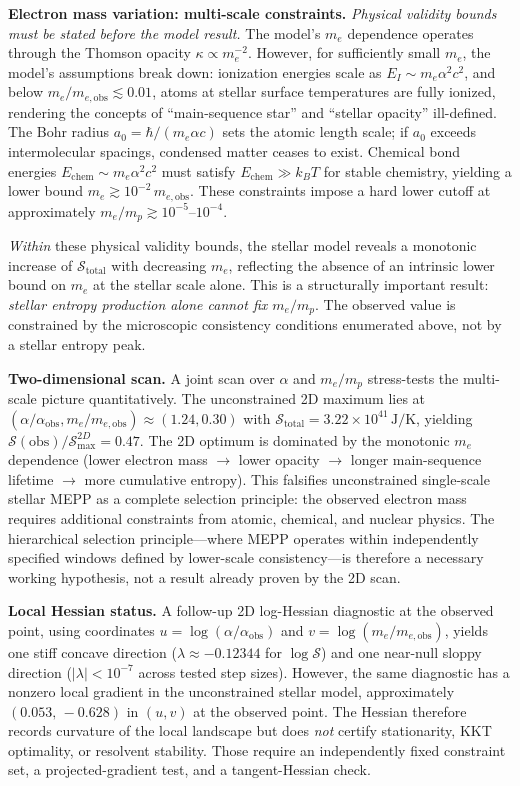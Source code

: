 \documentclass[12pt,a4paper]{article}
\theoremstyle{remark}
\begin{document}
\textbf{Electron mass variation: multi-scale constraints.} \emph{Physical validity bounds must be stated before the model result.} The model's $m_e$ dependence operates through the Thomson opacity $\kappa \propto m_e^{-2}$. However, for sufficiently small $m_e$, the model's assumptions break down: ionization energies scale as $E_I \sim m_e \alpha^2 c^2$, and below $m_e/m_{e,\text{obs}} \lesssim 0.01$, atoms at stellar surface temperatures are fully ionized, rendering the concepts of ``main-sequence star'' and ``stellar opacity'' ill-defined. The Bohr radius $a_0 = \hbar/(m_e \alpha c)$ sets the atomic length scale; if $a_0$ exceeds intermolecular spacings, condensed matter ceases to exist. Chemical bond energies $E_{\text{chem}} \sim m_e \alpha^2 c^2$ must satisfy $E_{\text{chem}} \gg k_B T$ for stable chemistry, yielding a lower bound $m_e \gtrsim 10^{-2}\,m_{e,\text{obs}}$. These constraints impose a hard lower cutoff at approximately $m_e/m_p \gtrsim 10^{-5}$--$10^{-4}$.

\emph{Within} these physical validity bounds, the stellar model reveals a monotonic increase of $\mathcal{S}_{\text{total}}$ with decreasing $m_e$, reflecting the absence of an intrinsic lower bound on $m_e$ at the stellar scale alone. This is a structurally important result: \emph{stellar entropy production alone cannot fix $m_e/m_p$}. The observed value is constrained by the microscopic consistency conditions enumerated above, not by a stellar entropy peak.

\textbf{Two-dimensional scan.} A joint scan over $\alpha$ and $m_e/m_p$ stress-tests the multi-scale picture quantitatively. The unconstrained 2D maximum lies at $(\alpha/\alpha_{\text{obs}}, m_e/m_{e,\text{obs}}) \approx (1.24, 0.30)$ with $\mathcal{S}_{\text{total}} = 3.22 \times 10^{41}\,\text{J/K}$, yielding $\mathcal{S}(\text{obs})/\mathcal{S}_{\text{max}}^{2D} = 0.47$. The 2D optimum is dominated by the monotonic $m_e$ dependence (lower electron mass $\to$ lower opacity $\to$ longer main-sequence lifetime $\to$ more cumulative entropy). This falsifies unconstrained single-scale stellar MEPP as a complete selection principle: the observed electron mass requires additional constraints from atomic, chemical, and nuclear physics. The hierarchical selection principle---where MEPP operates within independently specified windows defined by lower-scale consistency---is therefore a necessary working hypothesis, not a result already proven by the 2D scan.

\textbf{Local Hessian status.} A follow-up 2D log-Hessian diagnostic at the observed point, using coordinates $u=\log(\alpha/\alpha_{\mathrm{obs}})$ and $v=\log(m_e/m_{e,\mathrm{obs}})$, yields one stiff concave direction ($\lambda \approx -0.12344$ for $\log \mathcal{S}$) and one near-null sloppy direction ($|\lambda|<10^{-7}$ across tested step sizes). However, the same diagnostic has a nonzero local gradient in the unconstrained stellar model, approximately $(0.053,\,-0.628)$ in $(u,v)$ at the observed point. The Hessian therefore records curvature of the local landscape but does \emph{not} certify stationarity, KKT optimality, or resolvent stability. Those require an independently fixed constraint set, a projected-gradient test, and a tangent-Hessian check.
\end{document}
